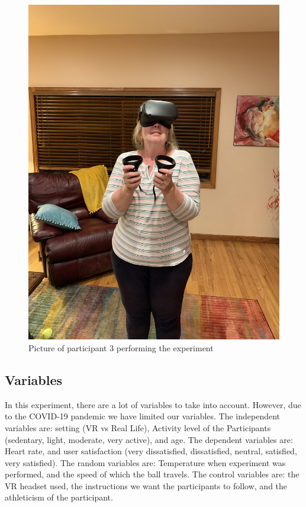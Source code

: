 \documentclass{sigchi}
\begin{document}
\begin{figure}
    \centering
    \includegraphics[scale=0.04, angle=270]{figures/Participant2.jpeg}
    \caption{Picture of participant 3 performing the experiment}
    \label{fig:my_label3}
\end{figure}

\subsection{Variables}
In this experiment, there are a lot of variables to take into account. However, due to the COVID-19 pandemic we have limited our variables. The independent variables are: setting (VR vs Real Life), Activity level of the Participants (sedentary, light, moderate, very active), and age. The dependent variables are: Heart rate, and user satisfaction (very dissatisfied, dissatisfied, neutral, satisfied, very satisfied). The random variables are: Temperature when experiment was performed, and the speed of which the ball travels. The control variables are: the VR headset used, the instructions we want the participants to follow, and the athleticism of the participant.
\end{document}
